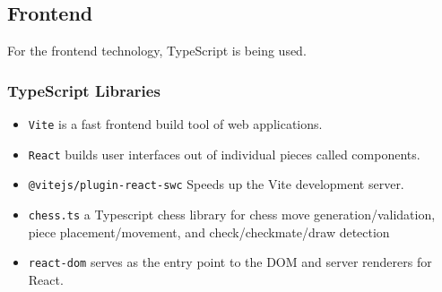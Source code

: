 \subsection{Frontend}

For the frontend technology, TypeScript is being used.

\subsubsection*{TypeScript Libraries}

\begin{itemize}
    \item \texttt{Vite} is a fast frontend build tool of web applications. \cite{ts:vite}
    
    \item \texttt{React} builds user interfaces out of individual pieces called components. \cite{ts:react}
    
    \item \texttt{@vitejs/plugin-react-swc} Speeds up the Vite development server. \cite{ts:swc}
    
    \item \texttt{chess.ts} a Typescript chess library for chess move generation/validation, piece placement/movement, and check/checkmate/draw detection \cite{ts:chess}
    
    \item \texttt{react-dom} serves as the entry point to the DOM and server renderers for React. \cite{ts:react-dom}
\end{itemize}
